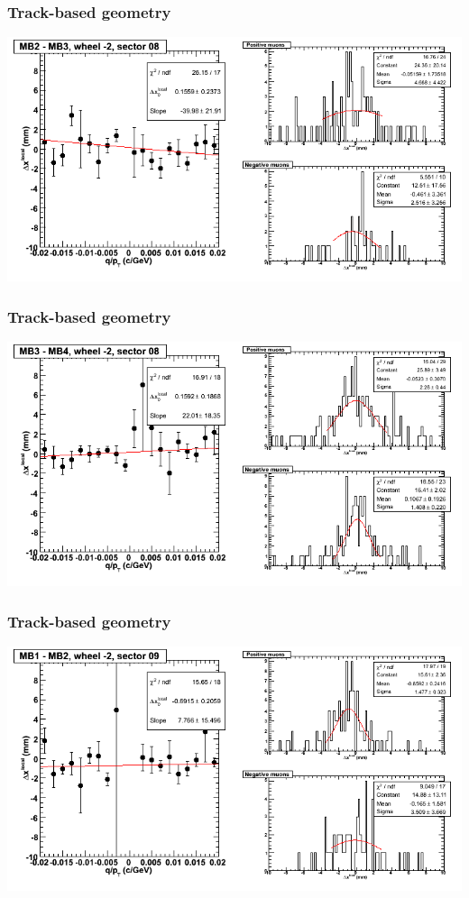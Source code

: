 \documentclass[compress]{beamer}
\begin{document}
\begin{frame}
\frametitle{Track-based geometry}
\includegraphics[width=\linewidth]{NOV4_segdiffs/dt13_resid_A_08_23.png}
\end{frame}

\begin{frame}
\frametitle{Track-based geometry}
\includegraphics[width=\linewidth]{NOV4_segdiffs/dt13_resid_A_08_34.png}
\end{frame}

\begin{frame}
\frametitle{Track-based geometry}
\includegraphics[width=\linewidth]{NOV4_segdiffs/dt13_resid_A_09_12.png}
\end{frame}
\end{document}
